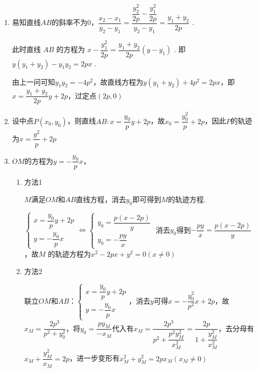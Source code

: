 \begin{enumerate}
\begin{jieda}
\begin{enumerate}
            又因为 ${OA} \bot  {OB}$ ,所以 ${x}_{1}{x}_{2} + {y}_{1}{y}_{2} = 0$ . 由此,可解得 ${x}_{1}{x}_{2} = 4{p}^{2},{y}_{1}{y}_{2} =  - 4{p}^{2}$ .
            \item 易知直线$AB$的斜率不为0，$\dfrac{{x}_{2} - {x}_{1}}{{y}_{2} - {y}_{1}} = \dfrac{\dfrac{{y}_{2}^{2}}{2p} - \dfrac{{y}_{1}^{2}}{2p}}{{y}_{2} - {y}_{1}} = \dfrac{{y}_{1} + {y}_{2}}{2p}$ .
            
            此时直线 ${AB}$ 的方程为 $x - \dfrac{{y}_{1}^{2}}{2p} = \dfrac{{y}_{1} + {y}_{2}}{2p}\left( y - y_1\right)$ . 即 $y\left( {{y}_{1} + {y}_{2}}\right)  - {y}_{1}{y}_{2} = {2px}$ . 

            由上一问可知${y}_{1}{y}_{2} =  - 4{p}^{2}$，故直线方程为$y\left( {{y}_{1} + {y}_{2}}\right)  +4p^2 = {2px}$，即$x = \dfrac{y_1+y_2}{2p} y + 2p$，过定点$(2p, 0)$
            \item 设中点$P(x_0, y_0)$，则直线$AB: x = \dfrac{y_0}{p} y + 2p$，故$x_0 = \dfrac{y_0^2}{p}+2p$，因此$P$的轨迹为$x = \dfrac{y^2}{p}+2p$
            \item $OM$的方程为$y = -\dfrac{y_0}{p}x$，
            
            \begin{enumerate}
                \item 方法1

                $M$满足$OM$和$AB$直线方程，消去$y_0$即可得到$M$的轨迹方程.

                $\left\{\begin{array}{l}
                 x = \dfrac{y_0}{p} y + 2p  \\
                 y = -\dfrac{y_0}{p}x 
                \end{array}\right. \Longleftrightarrow \left\{\begin{array}{l}
                 y_0 = \dfrac{p(x-2p)}{y}  \\
                 y_0 = -\dfrac{py}{x} 
                \end{array}\right.$
                消去$y_0$得到$-\dfrac{py}{x} = \dfrac{p(x-2p)}{y}$，故$M$ 的轨迹方程为$x^2 - 2px + y^2 = 0 (x \neq 0)$
                \item 方法2

                联立$OM$和$AB$：$\left\{\begin{array}{l}
                 x = \dfrac{y_0}{p} y + 2p  \\
                 y = -\dfrac{y_0}{p}x 
                \end{array}\right.$，消去$y$可得$x = -\dfrac{y_0^2}{p^2}x + 2p$，故$x_M = \dfrac{2p^3}{p^2+y_0^2}$，将$y_0 = \dfrac{py_M}{-x_M}$代入有$x_M = \dfrac{2p^3}{p^2+\dfrac{p^2y_M^2}{x_M^2}} = \dfrac{2p}{1+\dfrac{y_M^2}{x_M^2}}$，去分母有$x_M + \dfrac{y_M^2}{x_M} = 2p$，进一步变形有$x_M^2 + y_M^2 = 2px_M (x_M \neq 0)$
    

\end{enumerate}
\end{enumerate}
\end{jieda}
\end{enumerate}

